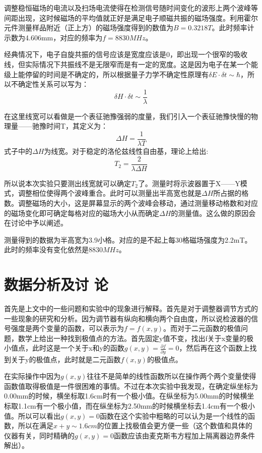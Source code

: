 \documentclass[aps,pre,12pt,preprint,onecolumn,showpacs,showkeys,UTF8]{article}
\begin{document}
调整稳恒磁场的电流以及扫场电流使得在检测信号随时间变化的波形上两个波峰等间距出现，这时候磁场的平均值就正好是满足电子顺磁共振的磁场强度。利用霍尔元件测量样品附近（正上方）的磁场强度得到的数值为$B=0.3218T$。此时频率计示数为4.606mm，对应的频率为$f=8830MHz$。

经典情况下，电子自旋共振的信号应该是宽度应该是0，即出现一个很窄的吸收线，但实际情况下共振线不是无限窄而是有一定的宽度。这是因为电子在某一个能级上能停留的时间是不确定的，所以根据量子力学不确定性原理有$\delta E \cdot \delta t \sim \hbar$，所以不确定性关系可以写为：
\begin{equation}
	\delta H \cdot \delta t \sim \frac{1}{\lambda}
\end{equation}

在这里线宽可以看做是一个表征驰豫强弱的度量，我们引入一个表征驰豫快慢的物理量——驰豫时间T，其定义为：
$$\Delta H =\frac{1}{\lambda T}$$
式子中的$\Delta H$为线宽。对于稳定的洛伦兹线性自由基，理论上给出:
\begin{equation}
	T_2=\frac{2}{\lambda \Delta H}
\end{equation}

所以说本次实验只要测出线宽就可以确定$T_2$了。测量时将示波器置于X——Y模式，调整相位使得两个波峰重合。此时可以测量出半高宽也就是$\Delta H$所占据的格数。调整磁场的大小，这是屏幕显示的两个波峰会移动，通过测量移动格数和对应的磁场变化即可确定每格对应的磁场大小从而确定$\Delta H$的测量值。这么做的原因会在讨论中予以阐述。

测量得到的数据为半高宽为3.9小格。对应的是不起上每30格磁场强度为2.2mT。此时的频率没有变化依然是$8830MHz$。

\section{数据分析及讨 论}

首先是上文中的一些问题和实验中的现象进行解释。首先是对于调整器调节方式的一些现象的研究和分析。因为调节器有纵向和横向两个自由度，所以说检波器的信号强度是两个变量的函数，可以表示为$f=f(x,y)$。而对于二元函数的极值问题，数学上给出一种找到极值点的方法。首先固定y值不变，找出f关于x变量的极小值点，此时这是一个关于x和y的函数$g(x,y)=\frac{\partial f}{\partial y}=0$，然后再在这个函数上找到关于y的极值点，此时就是二元函数$f(x,y)$的极值点。

在实际操作中因为$g(x,y)$往往不是简单的线性函数所以在操作两个两个变量使得函数值取得极值是一件很困难的事情。不过在本次实验中我发现，在确定纵坐标为0.00mm的时候，横坐标取1.6cm时有一个极小值。在纵坐标为5.00mm的时候横坐标取1.1cm有一个极小值，而在纵坐标为2.50mm的时候横坐标去1.4cm有一个极小值。所以可以看出$g(x,y)=0$函数在这个实验中粗略的可以认为是一个线性的函数，所以在满足$x+y\sim 1.6cm$的位置上找极值会更方便一些（这个数值和具体的仪器有关，同时精确的$g(x,y)=0$函数应该由麦克斯韦方程加上隔离器边界条件解出）。
\end{document}
